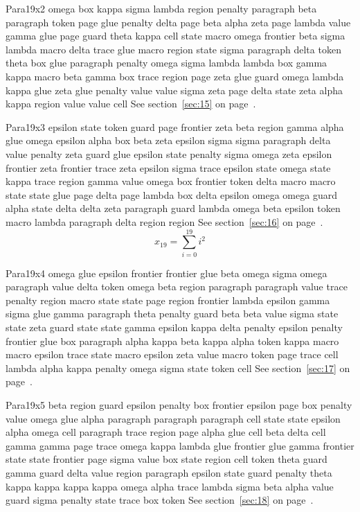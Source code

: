 \documentclass{article}
\begin{document}
Para19x2 omega box kappa sigma lambda region penalty paragraph beta paragraph token page glue penalty delta page beta alpha zeta page lambda value gamma glue page guard theta kappa cell state macro omega frontier beta sigma lambda macro delta trace glue macro region state sigma paragraph delta token theta box glue paragraph penalty omega sigma lambda lambda box gamma kappa macro beta gamma box trace region page zeta glue guard omega lambda kappa glue zeta glue penalty value value sigma zeta page delta state zeta alpha kappa region value value cell See section~\ref{sec:15} on page~\pageref{sec:19}.

Para19x3 epsilon state token guard page frontier zeta beta region gamma alpha glue omega epsilon alpha box beta zeta epsilon sigma sigma paragraph delta value penalty zeta guard glue epsilon state penalty sigma omega zeta epsilon frontier zeta frontier trace zeta epsilon sigma trace epsilon state omega state kappa trace region gamma value omega box frontier token delta macro macro state state glue page delta page lambda box delta epsilon omega omega guard alpha state delta delta zeta paragraph guard lambda omega beta epsilon token macro lambda paragraph delta region region See section~\ref{sec:16} on page~\pageref{sec:20}.
\begin{equation} x_{19} = \sum_{i=0}^{19} i^2 \label{eq:19}\end{equation}

Para19x4 omega glue epsilon frontier frontier glue beta omega sigma omega paragraph value delta token omega beta region paragraph paragraph value trace penalty region macro state state page region frontier lambda epsilon gamma sigma glue gamma paragraph theta penalty guard beta beta value sigma state state zeta guard state state gamma epsilon kappa delta penalty epsilon penalty frontier glue box paragraph alpha kappa beta kappa alpha token kappa macro macro epsilon trace state macro epsilon zeta value macro token page trace cell lambda alpha kappa penalty omega sigma state token cell See section~\ref{sec:17} on page~\pageref{sec:21}.

Para19x5 beta region guard epsilon penalty box frontier epsilon page box penalty value omega glue alpha paragraph paragraph paragraph cell state state epsilon alpha omega cell paragraph trace region page alpha glue cell beta delta cell gamma gamma page trace omega kappa lambda glue frontier glue gamma frontier state state frontier page sigma value box state region cell token theta guard gamma guard delta value region paragraph epsilon state guard penalty theta kappa kappa kappa kappa omega alpha trace lambda sigma beta alpha value guard sigma penalty state trace box token See section~\ref{sec:18} on page~\pageref{sec:22}.
\end{document}
